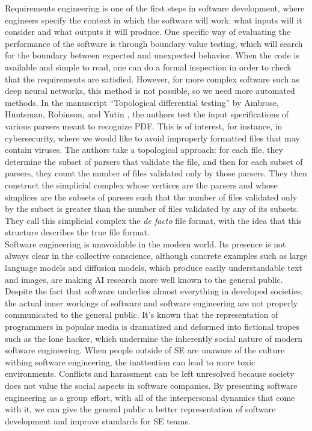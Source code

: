 \documentclass[11pt, oneside]{article}
\begin{document}
Requirements engineering is one of the first steps in software development, where engineers specify the context in which the software will work: what inputs will it consider and what outputs it will produce. One specific way of evaluating the performance of the software is through boundary value testing, which will search for the boundary between expected and unexpected behavior. When the code is available and simple to read, one can do a formal inspection in order to check that the requirements are satisfied. However, for more complex software such as deep neural networks, this method is not possible, so we need more automated methods. In the manuscript “Topological differential testing” by Ambrose, Huntsman, Robinson, and Yutin \cite{AHRY2020}, the authors test the input specifications of various parsers meant to recognize PDF. This is of interest, for instance, in cybersecurity, where we would like to avoid improperly formatted files that may contain viruses. The authors take a topological approach: for each file, they determine the subset of parsers that validate the file, and then for each subset of parsers, they count the number of files validated only by those parsers. They then construct the simplicial complex whose vertices are the parsers and whose simplices are the subsets of parsers such that the number of files validated only by the subset is greater than the number of files validated by any of its subsets. They call this simplicial complex the \textit{de facto} file format, with the idea that this structure describes the true file format.\\

Software engineering is unavoidable in the modern world. Its presence is not always clear in the collective conscience, although concrete examples such as large language models and diffusion models, which produce easily understandable text and images, are making AI research more well known to the general public. Despite the fact that software underlies almost everything in developed societies, the actual inner workings of software and software engineering are not properly communicated to the general public. It’s known that the representation of programmers in popular media is dramatized and deformed into fictional tropes such as the lone hacker, which undermine the inherently social nature of modern software engineering. When people outside of SE are unaware of the culture withing software engineering, the inattention can lead to more toxic environments. Conflicts and harassment can be left unresolved because society does not value the social aspects in software companies. By presenting software engineering as a group effort, with all of the interpersonal dynamics that come with it, we can give the general public a better representation of software development and improve standards for SE teams.
\end{document}
